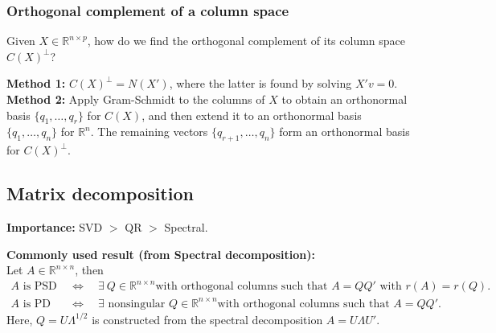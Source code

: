\documentclass{article}
\theoremstyle{break}
\newcommand{\R}{\ensuremath{\mathbb{R}}}
\begin{document}
\subsubsection{Orthogonal complement of a column space}
Given $X \in \R^{n\times p}$, how do we find the orthogonal complement of its column space $C(X)^\perp$?

\textbf{Method 1:} 
$C(X)^\perp = N(X')$, where the latter is found by solving $X'v = 0$.\\
\textbf{Method 2:} 
Apply Gram-Schmidt to the columns of $X$ to obtain an orthonormal basis $\{q_1,\ldots,q_r\}$ for $C(X)$, and then extend it to an orthonormal basis $\{q_1,\ldots,q_n\}$ for $\R^n$. The remaining vectors $\{q_{r+1},\ldots,q_n\}$ form an orthonormal basis for $C(X)^\perp$.


\subsection{Matrix decomposition}\label{sec:prelim-lm-matrix-decomp}
\textbf{Importance:} SVD $>$ QR $>$ Spectral.

\textbf{Commonly used result (from Spectral decomposition):}\\
Let $A \in \R^{n \times n}$, then
\begin{align*}
    A \text{ is PSD} \quad &\Longleftrightarrow \quad \exists\ Q\in \R^{n \times n} \text{with orthogonal columns such that } A = QQ' \text{ with } r(A) = r(Q).\\
    A \text{ is PD} \quad &\Longleftrightarrow \quad \exists \text{ nonsingular } Q\in \R^{n \times n} \text{with orthogonal columns such that } A = QQ'.
\end{align*}
Here, $Q=U\Lambda^{1/2}$ is constructed from the spectral decomposition $A=U\Lambda U'$.
\end{document}
